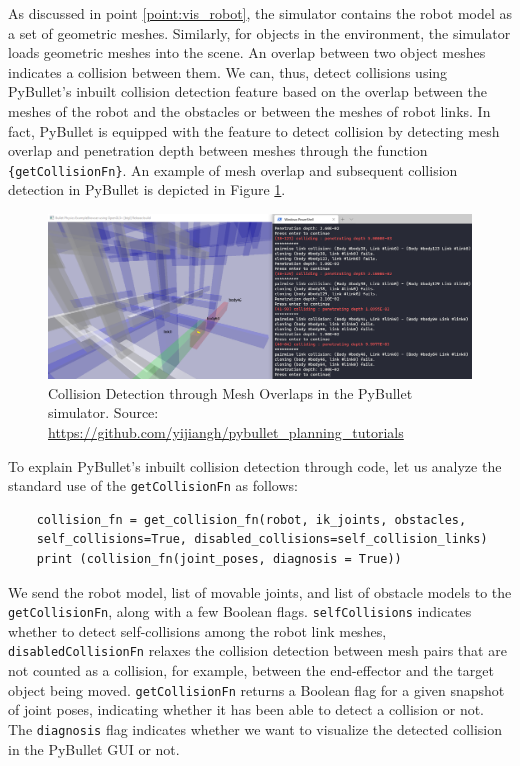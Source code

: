 As discussed in point \ref{point:vis_robot}, the simulator contains the robot model as a set of geometric meshes. Similarly, for objects in the environment, the simulator loads geometric meshes into the scene. An overlap between two object meshes indicates a collision between them. We can, thus, detect collisions using PyBullet's inbuilt collision detection feature based on the overlap between the meshes of the robot and the obstacles or between the meshes of robot links. In fact, PyBullet is equipped with the feature to detect collision by detecting mesh overlap and penetration depth between meshes through the function \verb_{getCollisionFn}_. An example of mesh overlap and subsequent collision detection in PyBullet is depicted in Figure \ref{fig:collisions-pybullet}.

\begin{figure}[ht]
    \centering
    \includegraphics[scale=0.3]{figures/bl-manipulator/assembly_collision.png}
    \caption[Collision detection through Mesh Overlap]{Collision Detection through Mesh Overlaps in the PyBullet simulator. Source:  \scriptsize{\url{https://github.com/yijiangh/pybullet_planning_tutorials}}}
    \label{fig:collisions-pybullet}
\end{figure}

To explain PyBullet's inbuilt collision detection through code, let us analyze the standard use of the \verb_getCollisionFn_ as follows:

\begin{verbatim}
    collision_fn = get_collision_fn(robot, ik_joints, obstacles, 
    self_collisions=True, disabled_collisions=self_collision_links)
    print (collision_fn(joint_poses, diagnosis = True))
\end{verbatim}

We send the robot model, list of movable joints, and list of obstacle models to the \verb_getCollisionFn_, along with a few Boolean flags. \verb_selfCollisions_ indicates whether to detect self-collisions among the robot link meshes, \verb_disabledCollisionFn_ relaxes the collision detection between mesh pairs that are not counted as a collision, for example, between the end-effector and the target object being moved. \verb_getCollisionFn_ returns a Boolean flag for a given snapshot of joint poses, indicating whether it has been able to detect a collision or not. The \verb_diagnosis_ flag indicates whether we want to visualize the detected collision in the PyBullet GUI or not.

